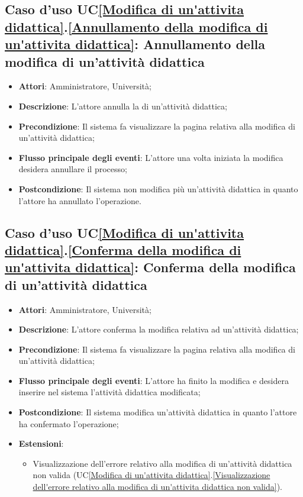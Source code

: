\subsection{Caso d'uso UC\ref{Modifica di un'attivita didattica}.\ref{Annullamento della modifica di un'attivita didattica}: Annullamento della modifica di un'attività didattica}
\begin{itemize}
	\item \textbf{Attori}: Amministratore, Università;
	\item \textbf{Descrizione}: L'attore annulla la di un'attività didattica;
	
	\item \textbf{Precondizione}: Il sistema fa visualizzare la pagina relativa alla modifica di un'attività didattica;
	
	\item \textbf{Flusso principale degli eventi}: L'attore una volta iniziata la modifica desidera annullare il processo;
	
	\item \textbf{Postcondizione}: Il sistema non modifica più un'attività didattica in quanto l'attore ha annullato l'operazione.
	
\end{itemize}

\subsection{Caso d'uso UC\ref{Modifica di un'attivita didattica}.\ref{Conferma della modifica di un'attivita didattica}: Conferma della modifica di un'attività didattica}
\begin{itemize}
	\item \textbf{Attori}: Amministratore, Università;
	\item \textbf{Descrizione}: L'attore conferma la modifica relativa ad un'attività didattica;
	
	\item \textbf{Precondizione}: Il sistema fa visualizzare la pagina relativa alla modifica di un'attività didattica;
	
	
	\item \textbf{Flusso principale degli eventi}: L'attore ha finito la modifica e desidera inserire nel sistema l'attività didattica modificata;
	
	\item \textbf{Postcondizione}: Il sistema modifica un'attività didattica in quanto l'attore ha confermato l'operazione;
	
	
	\item \textbf{Estensioni}:
	\begin{itemize}
		\item Visualizzazione dell'errore relativo alla modifica di un'attività didattica non valida (UC\ref{Modifica di un'attivita didattica}.\ref{Visualizzazione dell'errore relativo alla modifica di un'attivita didattica non valida}).
	\end{itemize}
\end{itemize}

